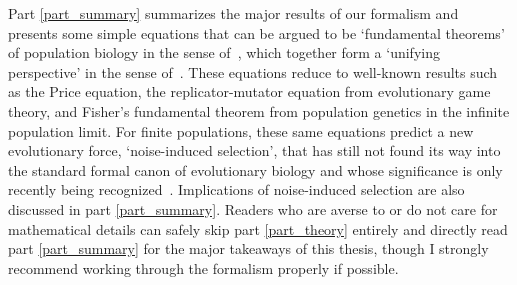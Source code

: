 Part \ref{part_summary} summarizes the major results of our formalism and presents some simple equations that can be argued to be `fundamental theorems' of population biology in the sense of~\cite{queller_fundamental_2017}, which together form a `unifying perspective' in the sense of~\cite{lion_theoretical_2018}. These equations reduce to well-known results such as the Price equation, the replicator-mutator equation from evolutionary game theory, and Fisher's fundamental theorem from population genetics in the infinite population limit. For finite populations, these same equations predict a new evolutionary force, `noise-induced selection', that has still not found its way into the standard formal canon of evolutionary biology and whose significance is only recently being recognized~\citep{constable_demographic_2016,mcleod_social_2019,mazzolini_universality_2022, kuosmanen_turnover_2022}. Implications of noise-induced selection are also discussed in part \ref{part_summary}. Readers who are averse to or do not care for mathematical details can safely skip part \ref{part_theory} entirely and directly read part \ref{part_summary} for the major takeaways of this thesis, though I strongly recommend working through the formalism properly if possible.

